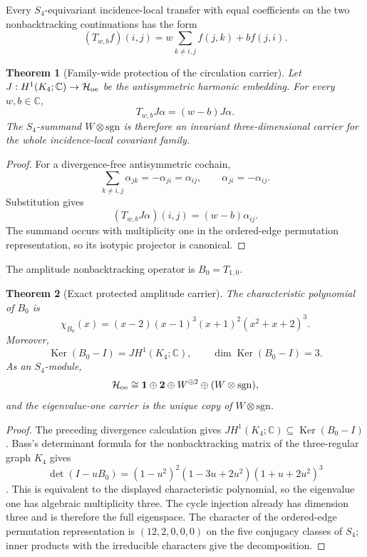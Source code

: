 \documentclass[11pt,oneside,openany]{book}
\numberwithin{equation}{chapter}
\newtheorem{theorem}{Theorem}[chapter]
\theoremstyle{definition}
\theoremstyle{remark}
\newcommand{\C}{\mathbb C}
\newcommand{\Ker}{\operatorname{Ker}}
\newcommand{\sgnrep}{\mathrm{sgn}}
\begin{document}
Every \(S_4\)-equivariant incidence-local transfer with equal coefficients
on the two nonbacktracking continuations has the form
\[
 (T_{w,b}f)(i,j)
 =w\sum_{k\neq i,j}f(j,k)+bf(j,i).
\]

\begin{theorem}[Family-wide protection of the circulation carrier]
\label{thm:family-protected-carrier}
Let \(J:H^1(K_4;\C)\to\mathcal H_{\rm oe}\) be the antisymmetric harmonic
embedding.  For every \(w,b\in\C\),
\[
 \boxed{T_{w,b}J\alpha=(w-b)J\alpha.}
\]
The \(S_4\)-summand \(W\otimes\sgnrep\) is therefore an invariant
three-dimensional carrier for the whole incidence-local covariant family.
\end{theorem}

\begin{proof}
For a divergence-free antisymmetric cochain,
\[
 \sum_{k\neq i,j}\alpha_{jk}
 =-\alpha_{ji}
 =\alpha_{ij},
 \qquad
 \alpha_{ji}=-\alpha_{ij}.
\]
Substitution gives
\[
 (T_{w,b}J\alpha)(i,j)
 =(w-b)\alpha_{ij}.
\]
The summand occurs with multiplicity one in the ordered-edge permutation
representation, so its isotypic projector is canonical.
\end{proof}

The amplitude nonbacktracking operator is \(B_0=T_{1,0}\).

\begin{theorem}[Exact protected amplitude carrier]
\label{thm:exact-oriented-carrier}
The characteristic polynomial of \(B_0\) is
\[
 \boxed{
 \chi_{B_0}(x)
 =(x-2)(x-1)^3(x+1)^2(x^2+x+2)^3.}
\]
Moreover,
\[
 \boxed{
 \Ker(B_0-I)=JH^1(K_4;\C),
 \qquad
 \dim\Ker(B_0-I)=3.}
\]
As an \(S_4\)-module,
\[
 \mathcal H_{\rm oe}
 \cong\mathbf1\oplus\mathbf2\oplus W^{\oplus2}
       \oplus(W\otimes\sgnrep),
\]
and the eigenvalue-one carrier is the unique copy of
\(W\otimes\sgnrep\).
\end{theorem}

\begin{proof}
The preceding divergence calculation gives
\(JH^1(K_4;\C)\subseteq\Ker(B_0-I)\).  Bass's determinant formula for the
nonbacktracking matrix of the three-regular graph \(K_4\) gives
\[
 \det(I-uB_0)
 =(1-u^2)^2(1-3u+2u^2)(1+u+2u^2)^3
\]
\cite{Bass1992,Terras2011}.  This is equivalent to the displayed
characteristic polynomial, so the eigenvalue one has algebraic multiplicity
three.  The cycle injection already has dimension three and is therefore
the full eigenspace.  The character of the ordered-edge permutation
representation is \((12,2,0,0,0)\) on the five conjugacy classes of \(S_4\);
inner products with the irreducible characters give the decomposition.
\end{proof}
\end{document}
